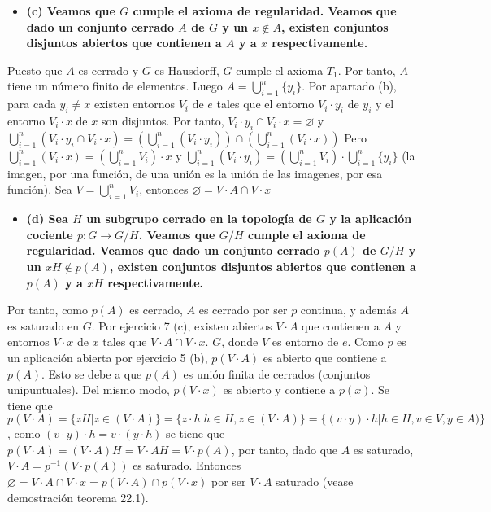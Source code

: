 \documentclass{article}
\begin{document}
\begin{itemize}
\item \bf (c) \rm Veamos que $G$ cumple el axioma de regularidad. Veamos que dado un conjunto cerrado $A$ de $G$ y un $x\notin A$, existen conjuntos disjuntos abiertos que contienen a $A$ y a $x$ respectivamente.
\end{itemize}
Puesto que $A$ es cerrado y $G$ es Hausdorff, $G$ cumple el axioma $T_1$. Por tanto, $A$ tiene un número finito de elementos. Luego $A=\bigcup_{i=1}^n\{y_i\}$. Por apartado (b), para cada $y_i\neq x$ existen entornos $V_i$ de $e$ tales que el entorno $V_i\cdot y_i$ de $y_i$ y el entorno $V_i\cdot x$ de $x$ son disjuntos. Por tanto, $V_i\cdot y_i\cap V_i\cdot x=\varnothing$ y $\bigcup_{i=1}^n\left(V_i\cdot y_i\cap V_i\cdot x\right)= (\bigcup_{i=1}^n(V_i\cdot y_i))\cap(\bigcup_{i=1}^n (V_i\cdot x))$
Pero $\bigcup_{i=1}^n (V_i\cdot x)=(\bigcup_{i=1}^n V_i)\cdot x$ y $\bigcup_{i=1}^n (V_i\cdot y_i)=(\bigcup_{i=1}^n V_i)\cdot \bigcup_{i=1}^n \{y_i\}$ (la imagen, por una función, de una unión es la unión de las imagenes, por esa función). Sea $V=\bigcup_{i=1}^n V_i$, entonces $\varnothing = V\cdot A\cap V\cdot x$
\begin{itemize}
\item \bf (d) \rm Sea $H$ un subgrupo cerrado en la topología de $G$ y la aplicación cociente $p:G\rightarrow G/H$. Veamos que $G/H$ cumple el axioma de regularidad. Veamos que dado un conjunto cerrado $p(A)$ de $G/H$ y un $xH\notin p(A)$, existen conjuntos disjuntos abiertos que contienen a $p(A)$ y a $xH$ respectivamente.
\end{itemize}
Por tanto, como $p(A)$ es cerrado, $A$ es cerrado por ser $p$ continua, y además $A$ es saturado en $G$. Por ejercicio 7 (c), existen abiertos $V\cdot A$ que contienen a $A$ y entornos $V\cdot x$ de $x$ tales que $V\cdot A\cap V\cdot x$. $G$, donde $V$ es entorno de $e$. Como $p$ es un aplicación abierta por ejercicio 5 (b), $p(V\cdot A) $ es abierto que contiene a $p(A)$. Esto se debe a que $p(A)$ es unión finita de cerrados (conjuntos unipuntuales). Del mismo modo, $p(V\cdot x) $ es abierto y contiene a $p(x)$. Se tiene que $p(V\cdot A)=\{zH |z\in (V\cdot A)\}=\{z\cdot h|h\in H,z\in (V\cdot A)\}=\{(v\cdot y )\cdot h|h\in H,v\in V,y\in A)\}$, como $(v\cdot y )\cdot h = v\cdot (y \cdot h)$ se tiene que $p(V\cdot A)=(V\cdot A)H=V\cdot AH= V\cdot p(A)$, por tanto, dado que $A$ es saturado, $V\cdot A=p^{-1}(V\cdot p(A))$ es saturado. Entonces $\varnothing =V\cdot A\cap V\cdot x=p(V\cdot A)\cap p(V\cdot x)$ por ser $V\cdot A$ saturado (vease demostración teorema 22.1).
\end{document}
